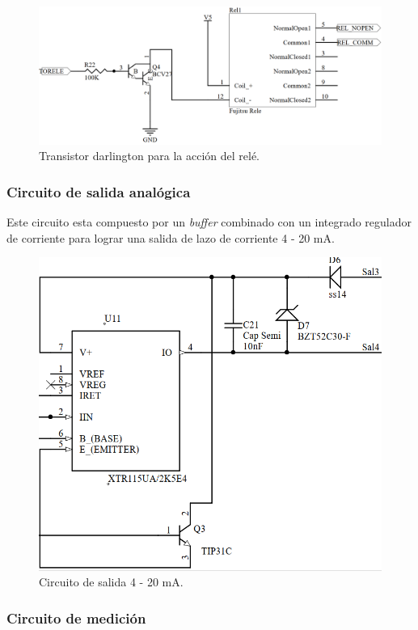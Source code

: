 \begin{figure}[h]
	\centering
	\includegraphics[width=120mm,keepaspectratio]{Figures/rele1.png}
	\caption{Transistor darlington para la acción del relé.}
	\label{fig:rele1equem}
\end{figure}

\subsubsection{Circuito de salida analógica}
Este circuito esta compuesto por un \textit{buffer} combinado con un integrado regulador de corriente para lograr una salida de lazo de corriente 4 - 20 mA.

\begin{figure}[h]
	\centering
	\includegraphics[width=120mm,keepaspectratio]{Figures/salida420.png}
	\caption{Circuito de salida 4 - 20 mA.}
	\label{fig:rele1equem}
\end{figure}


\subsubsection{Circuito de medición}

